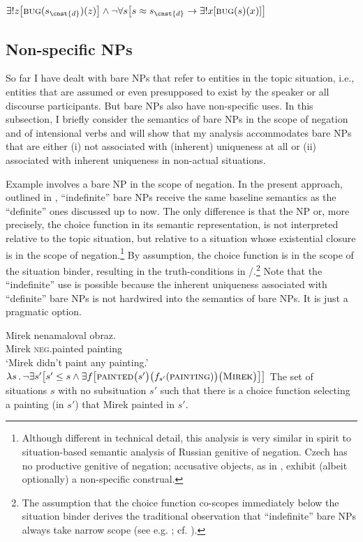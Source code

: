 \documentclass[output=paper,colorlinks,citecolor=brown,newtxmath]{langscibook}
\begin{document}
\ea $\exists!z\big[\textsc{bug}(s_{\cnst{d}})(z)\big]\wedge\neg\forall s\big[s\approx s_{\cnst{d}}\rightarrow\exists!x[\textsc{bug}(s)(x)]\big]$\label{simik:ex:bug}
\z

\subsection{Non-specific NPs}\label{simik:sec:non-sp}

So far I have dealt with bare NPs that refer to entities in the topic situation, i.e., entities that are assumed or even presupposed to exist by the speaker or all discourse participants. But bare NPs also have non-specific uses. In this subsection, I briefly consider the semantics of bare NPs in the scope of negation and of intensional verbs and will show that my analysis accommodates bare NPs that are either (i) not associated with (inherent) uniqueness at all or (ii) associated with inherent uniqueness in non-actual situations.

Example  involves a bare NP in the scope of negation. In the present approach, outlined in , ``indefinite'' bare NPs receive the same baseline semantics as the ``definite'' ones discussed up to now. The only difference is that the NP or, more precisely, the choice function in its semantic representation, is not interpreted relative to the topic situation, but relative to a situation whose existential closure is in the scope of negation.\footnote{Although different in technical detail, this analysis is very similar in spirit to  situation-based semantic analysis of Russian genitive of negation. Czech has no productive genitive of negation; accusative objects, as in , exhibit (albeit optionally) a non-specific construal.} By assumption, the choice function is in the scope of the situation binder, resulting in the truth-conditions in /.\footnote{The assumption that the choice function co-scopes immediately below the situation binder derives the traditional observation that ``indefinite'' bare NPs always take narrow scope (see e.g. \citealt{Dayal2004,Geist2010}; cf. \citealt{Borik2016}).} Note that the ``indefinite'' use is possible because the inherent uniqueness associated with ``definite'' bare NPs is not hardwired into the semantics of bare NPs. It is just a pragmatic option.

\ea\ea\label{simik:ex:paint-a}\gll Mirek nenamaloval obraz.\\
Mirek \textsc{neg.}painted painting\\
\glt `Mirek didn't paint any painting.'
\ex $\lambda s\,.\,\neg\exists s'
\big[s'\leq s
\wedge\exists f\big[\textsc{painted}\big(s'\big)\big(f_{s'}(\textsc{painting})\big)\big(\textsc{Mirek}\big)\big]\big]$\label{simik:ex:paint-b}
\ex The set of situations $s$ with no subsituation $s'$ such that there is a choice function selecting a painting (in $s'$) that Mirek painted in $s'$.\label{simik:ex:paint-c}
\z\z
\end{document}
